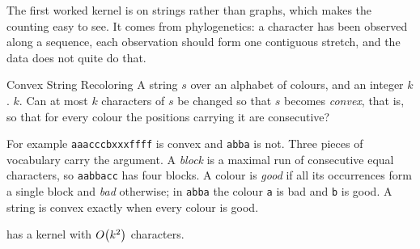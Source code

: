 The first worked kernel is on strings rather than graphs, which makes the
counting easy to see. It comes from phylogenetics: a character has been observed
along a sequence, each observation should form one contiguous stretch, and the
data does not quite do that.

\begin{probdef}{Convex String Recoloring}
  \instance A string $s$ over an alphabet of colours, and an integer $k$.
  \parameter $k$.
  \question Can at most $k$ characters of $s$ be changed so that $s$ becomes
  \emph{convex}, that is, so that for every colour the positions carrying it are
  consecutive?
\end{probdef}

For example \texttt{aaacccbxxxffff} is convex and \texttt{abba} is not. Three
pieces of vocabulary carry the argument. A \emph{block} is a maximal run of
consecutive equal characters, so \texttt{aabbacc} has four blocks. A colour is
\emph{good} if all its occurrences form a single block and \emph{bad}
otherwise; in \texttt{abba} the colour \texttt{a} is bad and \texttt{b} is good.
A string is convex exactly when every colour is good.

\begin{theorem}\label{thm:convex-kernel}
 has a kernel with $O\!\left(k^2\right)$ characters.
\end{theorem}

